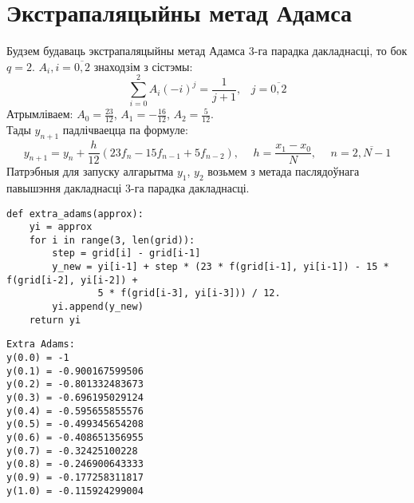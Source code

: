 \section{Экстрапаляцыйны метад Адамса}
Будзем будаваць экстрапаляцыйны метад Адамса 3-га парадка дакладнасці, то бок $q=2$. $A_i, i = \overline{0, 2}$ знаходзім з сістэмы:
\begin{equation}
    \sum _{i = 0}^{2} A_i (-i)^j = \frac{1}{j+1} , \hspace{10pt} j = \overline{0,2}
\end{equation}
Атрымліваем: $A_0 = \frac{23}{12}$, $A_1 = -\frac{16}{12}$, $A_2 = \frac{5}{12}$.\\
Тады $y_{n+1}$ падлічваецца па формуле:
\begin{equation}
    y_{n+1} = y_n + \frac{h}{12}(23f_n - 15f_{n-1} + 5f_{n-2}), \hspace{15pt} h = \frac{x_1 - x_0}{N},\hspace{15pt} n = \overline{2, N-1}
\end{equation}
Патрэбныя для запуску алгарытма $y_1$, $y_2$ возьмем з метада паслядоўнага павышэння дакладнасці 3-га парадка дакладнасці.

{\small
\begin{verbatim}
def extra_adams(approx):
    yi = approx
    for i in range(3, len(grid)):
        step = grid[i] - grid[i-1]
        y_new = yi[i-1] + step * (23 * f(grid[i-1], yi[i-1]) - 15 * f(grid[i-2], yi[i-2]) +
                5 * f(grid[i-3], yi[i-3])) / 12.
        yi.append(y_new)
    return yi
\end{verbatim}
}

{\small
\begin{verbatim}
Extra Adams:
y(0.0) = -1
y(0.1) = -0.900167599506
y(0.2) = -0.801332483673
y(0.3) = -0.696195029124
y(0.4) = -0.595655855576
y(0.5) = -0.499345654208
y(0.6) = -0.408651356955
y(0.7) = -0.32425100228
y(0.8) = -0.246900643333
y(0.9) = -0.177258311817
y(1.0) = -0.115924299004
\end{verbatim}
}

